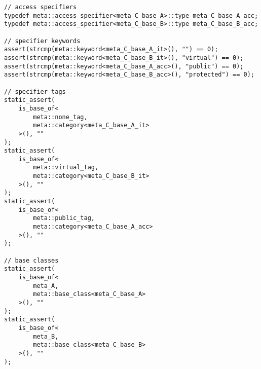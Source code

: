 \begin{verbatim}
// access specifiers
typedef meta::access_specifier<meta_C_base_A>::type meta_C_base_A_acc;
typedef meta::access_specifier<meta_C_base_B>::type meta_C_base_B_acc;

// specifier keywords
assert(strcmp(meta::keyword<meta_C_base_A_it>(), "") == 0);
assert(strcmp(meta::keyword<meta_C_base_B_it>(), "virtual") == 0);
assert(strcmp(meta::keyword<meta_C_base_A_acc>(), "public") == 0);
assert(strcmp(meta::keyword<meta_C_base_B_acc>(), "protected") == 0);

// specifier tags
static_assert(
	is_base_of<
		meta::none_tag,
		meta::category<meta_C_base_A_it>
	>(), ""
);
static_assert(
	is_base_of<
		meta::virtual_tag,
		meta::category<meta_C_base_B_it>
	>(), ""
);
static_assert(
	is_base_of<
		meta::public_tag,
		meta::category<meta_C_base_A_acc>
	>(), ""
);

// base classes
static_assert(
	is_base_of<
		meta_A,
		meta::base_class<meta_C_base_A>
	>(), ""
);
static_assert(
	is_base_of<
		meta_B,
		meta::base_class<meta_C_base_B>
	>(), ""
);

\end{verbatim}

